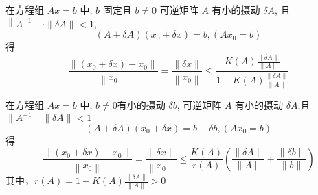 \begin{theorem}
在方程组 \( {A} {x}={b} \) 中, \( {b} \) 固定且 \( {b} \neq {0} \) 可逆矩阵 \( A \) 有小的摄动 \( \delta A \), 且 \( \left\|A^{-1}\right\| \cdot\|\delta A\|<1 \),
\[
(A+\delta A)\left(x_{0}+\delta x\right)=b,\left(A x_{0}=b\right)
\]
得
\[
\frac{\left\|\left(x_{0}+\delta x\right)-x_{0}\right\|}{\left\|x_{0}\right\|}=\frac{\|\delta x\|}{\left\|x_{0}\right\|} \leq \frac{K(A) \frac{\|\delta A\|}{\|A\|}}{1-K(A) \frac{\|\delta A\|}{\|A\|}}
\]
\end{theorem}

\begin{theorem}
	在方程组 \( {A} {x}={b} \) 中, \( {b} \ne 0\)有小的摄动 \( \delta b \), 可逆矩阵 \( A \) 有小的摄动 \( \delta A \),且$\|A^{-1}\|\| \delta A\|<1$
\[
(A+\delta A)\left(x_{0}+\delta x\right)=b+\delta b,\left(A x_{0}=b\right)
\]
得
	\[
	\frac{\left\|\left(x_{0}+\delta x\right)-x_{0}\right\|}{\left\|x_{0}\right\|}=\frac{\|\delta x\|}{\left\|x_{0}\right\|} \leq \dfrac{K(A)}{r(A)}\left( \frac{\|\delta A\|}{\|A\|}+\frac{\|\delta b\|}{\|b\|}  \right)
	\]其中，$r(A)=1-K(A)\frac{\|\delta A\|}{\|A\|}>0$
\end{theorem}
